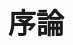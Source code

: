 \chapter{序論}

\begin{comment}
　近年，インターネットの普及により，ネットワーク上を流れるトラヒックが急激に増加している．
トラヒック増加の原因としては,動画配信等のリッチコンテンツの増加，ソーシャルネットワーキングサービスなど多様なアプリケーションが次々と出現し,スマートフォンなどの新たなモバイル端末の利用拡大が進んでいることが挙げられる\cite{joron1}．

ネットワーク内部の複雑化が進むことで，ネットワーク全体の挙動理解や性能予測が困難になってきている．
ネットワークのトラヒックが爆発的に増加しているだけでなく,ネットワークの状態とユーザの振舞いが相互作用を起こし,ネットワークが予期できない状態に陥ることが報告されているからである\cite{joron1}．
さらに，この問題はネットワークが大規模であるほど顕著となる．

エンド端末間パスの物理的な最大レートである物理帯域や，背景トラヒックの影響を考慮した利用可能帯域が様々な値となり，さらに時間とともに大きく変動する事が考えられる\cite{joron9}．このように，ネットワークの振舞いを理解する事が困難になってきている現在，特に大規模ネットワークに対する性能評価手法への要求が高まっている\cite{joron2}．

ネットワークの性能評価手法として，数学的解析・シミュレーション・実験の大きく3種類の手法が存在する．

数学的解析は，対象とするネットワークを数学的にモデル化することによってその性能を解析する手法であり，振る舞いが解析的に解くことができるようなネットワークの性能評価に適している．数学的解析による大規模ネットワークの性能評価手法の研究も近年活発に行われているが \cite{joron3}，モデル化する際に多くの近似が必要であるため性能評価結果は近似に依存する部分がある．

シミュレーションは，対象とするネットワークの抽象的なモデルを計算機上に構築し，ネットワークの挙動を模擬することによってその性能を評価する手法である．この手法は，数学的解析よりもより複雑なネットワークの性能評価が可能である．加えて，実際に機器を用いてネットワークを構築することなく，その性能を評価する事が可能である．
ただし，対象を完全に模擬したシミュレーションモデルを利用する事は不可能で，対象の特徴を抽出したシミュレーションモデルを利用して結果の計測を行う．
特徴を抽出する際，どのような特徴を抽出するかによりシミュレータ上での計測結果が変わってしまうことから，実験に用いたモデルの妥当性を判断する事が必要である\cite{joron4}．


\end{comment}
